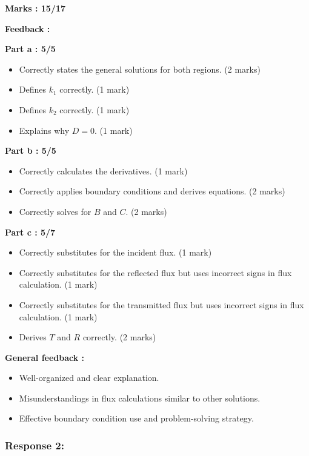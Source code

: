 \documentclass[a4paper,11pt]{article}
\begin{document}
\textbf{Marks : 15/17}

\textbf{Feedback :}

\textbf{Part a : 5/5}

\begin{itemize}
    \item Correctly states the general solutions for both regions. (2 marks)
    \item Defines $k_1$ correctly. (1 mark)
    \item Defines $k_2$ correctly. (1 mark)
    \item Explains why $D = 0$. (1 mark)
\end{itemize}

\textbf{Part b : 5/5}

\begin{itemize}
    \item Correctly calculates the derivatives. (1 mark)
    \item Correctly applies boundary conditions and derives equations. (2 marks)
    \item Correctly solves for $B$ and $C$. (2 marks)
\end{itemize}


\textbf{Part c : 5/7}

\begin{itemize}
    \item Correctly substitutes for the incident flux. (1 mark)
    \item Correctly substitutes for the reflected flux but uses incorrect signs in flux calculation. (1 mark)
    \item Correctly substitutes for the transmitted flux but uses incorrect signs in flux calculation. (1 mark)
    \item Derives $T$ and $R$ correctly. (2 marks)
\end{itemize}

\textbf{General feedback :}

\begin{itemize}
    \item Well-organized and clear explanation.
    \item Misunderstandings in flux calculations similar to other solutions.
    \item Effective boundary condition use and problem-solving strategy.
\end{itemize}


\subsubsection*{Response 2:}
\end{document}

